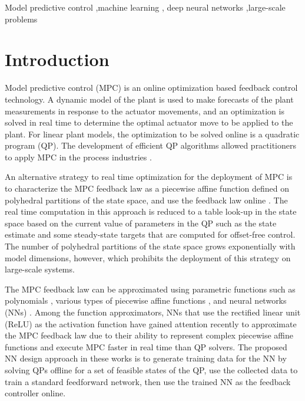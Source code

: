 \documentclass[preprint,5p, twocolumn, authoryear]{elsarticle}
\begin{document}
\begin{frontmatter}
\begin{keyword}
Model predictive control \sep machine learning \sep 
deep neural networks \sep large-scale problems
\end{keyword}

\end{frontmatter}

\section{Introduction} \label{sec:introduction}

Model predictive control (MPC) is an online 
optimization based feedback control technology. A dynamic model 
of the plant is used to make forecasts of the plant measurements
in response to the actuator movements, and an optimization
is solved in real time to determine the optimal actuator
move to be applied to the plant. For linear plant models, 
the optimization to be solved online is a quadratic program (QP).
The development 
of efficient QP algorithms 
\citep*{kouzoupis:frison:zanelli:diehl:2018, wright:2019}
allowed practitioners to apply MPC
in the process industries \citep*{qin:badgwell:2003, lahiri:2017}.

An alternative strategy to 
real time optimization for the deployment of MPC 
is to characterize the MPC feedback law
as a piecewise affine function defined on 
polyhedral partitions of the state space, 
and use the feedback law online
\citep*{bemporad:morari:dua:pistikopoulos:2002, 
seron:goodwin:dedona:2003}.
The real time computation in this approach is 
reduced to a table look-up in the state space
based on the current value of parameters 
in the QP such as the state estimate and some 
steady-state targets that are computed for 
offset-free control. The number of polyhedral 
partitions of the state space grows exponentially
with model dimensions, however, which prohibits
the deployment of this strategy on large-scale 
systems.

The MPC feedback law can be approximated using 
parametric functions such as polynomials
\citep*{kvasnica:lofberg:fikar:2011}, 
various types of piecewise affine functions
\citep*{bemporad:oliveri:poggi:storace:2011, wen:ma:ydstie:2009},
and neural networks (NNs) \citep*{cavagnari:magni:scattolini:1999}.
Among the
function approximators, NNs that use the rectified linear unit 
(ReLU) as the activation function 
have gained attention recently 
\citep*{chen:saulnier:atanasov:lee:kumar:pappas:morari:2018, 
karg:lucia:2020, paulson:mesbah:2020, lovelett:dietrich:lee:kevrekidis:2020}
to approximate
the MPC feedback law due to their ability to represent complex 
piecewise affine functions
\citep*{montufar:pascanu:cho:bengio:2014}
and execute MPC faster in real time than QP solvers. 
The proposed NN design approach in 
these works is to generate training 
data for the NN by solving QPs offline
for a set of feasible states of the QP, use the
collected data to train a standard feedforward network, then 
use the trained NN as the feedback controller online.
\end{document}
